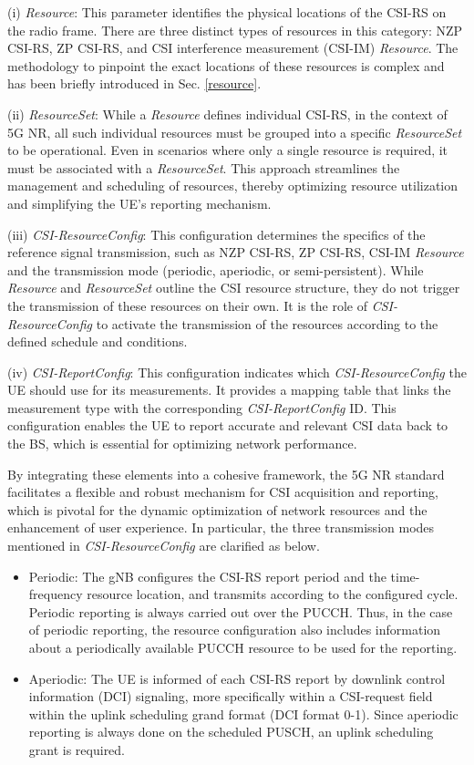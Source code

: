 \documentclass[lettersize,journal]{IEEEtran}
\begin{document}
\begin{appendices}
(i) \emph{Resource}: This parameter identifies the physical locations of the CSI-RS on the radio frame. There are three distinct types of resources in this category: NZP CSI-RS, ZP CSI-RS, and CSI interference measurement (CSI-IM) \emph{Resource}. The methodology to pinpoint the exact locations of these resources is complex and has been briefly introduced in Sec. \ref{resource}.

(ii) \emph{ResourceSet}: While a \emph{Resource} defines individual CSI-RS, in the context of 5G NR, all such individual resources must be grouped into a specific \emph{ResourceSet} to be operational. Even in scenarios where only a single resource is required, it must be associated with a \emph{ResourceSet}.  This approach streamlines the management and scheduling of resources, thereby optimizing resource utilization and simplifying the UE's reporting mechanism.

(iii) \emph{CSI-ResourceConfig}: This configuration determines the specifics of the reference signal transmission, such as NZP CSI-RS, ZP CSI-RS, CSI-IM \emph{Resource} and the transmission mode (periodic, aperiodic, or semi-persistent). While  \emph{Resource} and \emph{ResourceSet} outline the CSI resource structure, they do not trigger the transmission of these resources on their own. It is the role of \emph{CSI-ResourceConfig} to activate the transmission of the resources according to the defined schedule and conditions.

(iv) \emph{CSI-ReportConfig}: This configuration indicates which \emph{CSI-ResourceConfig} the UE should use for its measurements. It provides a mapping table that links the measurement type with the corresponding \emph{CSI-ReportConfig} ID. This configuration enables the UE to report accurate and relevant CSI data back to the BS, which is essential for optimizing network performance.

By integrating these elements into a cohesive framework, the 5G NR standard facilitates a flexible and robust mechanism for CSI acquisition and reporting, which is pivotal for the dynamic optimization of network resources and the enhancement of user experience. In particular, the three transmission modes mentioned in \emph{CSI-ResourceConfig} are clarified as below.
\begin{itemize}
    \item Periodic: The gNB configures the CSI-RS report period and the time-frequency resource location, and transmits according to the configured cycle. Periodic reporting is always carried out over the PUCCH. Thus, in the case of periodic reporting, the resource configuration also includes information about a periodically available PUCCH resource to be used for the reporting.
    \item Aperiodic: The UE is informed of each CSI-RS report by downlink control information (DCI) signaling, more specifically within a CSI-request field within the uplink scheduling grand format (DCI format 0-1). Since aperiodic reporting is always done on the scheduled PUSCH, an uplink scheduling grant is required. 
    

\end{itemize}
\end{appendices}
\end{document}
